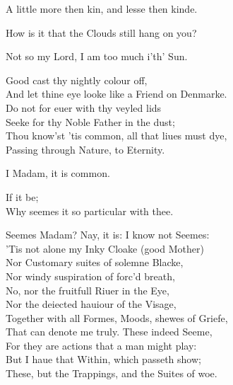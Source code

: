 \documentclass[a5paper,DIV=calc,11pt]{scrbook}
\begin{document}
\begin{drama*}
    \hamspeaks A little more then kin, and lesse then kinde.
    
    \kingspeaks How is it that the Clouds still hang on you?
    
    \hamspeaks Not so my Lord, I am too much i'th' Sun.
    
    \queenspeaks Good \ham cast thy nightly colour off,\\
    And let thine eye looke like a Friend on Denmarke.\\
    Do not for euer with thy veyled lids\\
    Seeke for thy Noble Father in the dust;\\
    Thou know'st 'tis common, all that liues must dye,\\
    Passing through Nature, to Eternity.
    
    \hamspeaks I Madam, it is common.
    
    \queenspeaks If it be;\\
    Why seemes it so particular with thee.
    
    \hamspeaks Seemes Madam? Nay, it is: I know not Seemes:\\
    'Tis not alone my Inky Cloake (good Mother)\\
    Nor Customary suites of solemne Blacke,\\
    Nor windy suspiration of forc'd breath,\\
    No, nor the fruitfull Riuer in the Eye,\\
    Nor the deiected hauiour of the Visage,\\
    Together with all Formes, Moods, shewes of Griefe,\\
    That can denote me truly. These indeed Seeme,\\
    For they are actions that a man might play:\\
    But I haue that Within, which passeth show;\\
    These, but the Trappings, and the Suites of woe.
    

\end{drama*}
\end{document}
